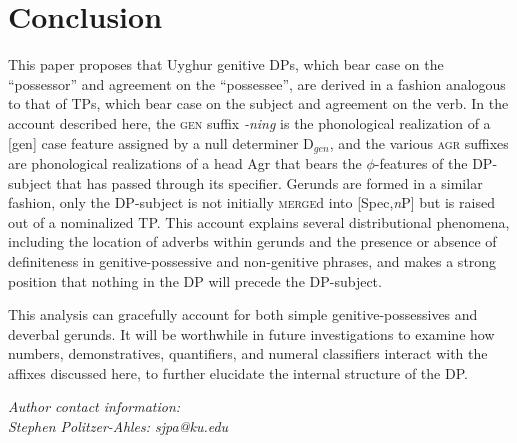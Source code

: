 \documentclass[letterpaper,12pt]{article}
\newcommand{\posst}{\textsc{agr}}
\newcommand{\gen}{\textsc{gen}}
\begin{document}
\section{Conclusion}
This paper proposes that Uyghur genitive DPs, which bear case on the ``possessor'' and agreement on the ``possessee'', are derived in a fashion analogous to that of
TPs, which bear case on the subject and agreement on the verb. In the account described here, the \gen{} suffix \textsl{-ning} is the phonological realization of
a [gen] case feature assigned by a null determiner D$_{gen}$, and the various \posst{} suffixes are phonological realizations of a head Agr that bears the $\phi$-features of the DP-subject that has passed through its specifier. Gerunds are formed in a similar fashion, only the
DP-subject is not initially \textsc{merge}d into [Spec,\textit{n}P] but is raised out of a nominalized TP. This account explains several distributional phenomena,
including the location of adverbs within gerunds and the presence or absence of definiteness in genitive-possessive and non-genitive phrases, and makes a strong
position that nothing in the DP will precede the DP-subject.

This analysis can gracefully account for both simple genitive-possessives and deverbal gerunds. It will be worthwhile in future investigations to examine how
numbers, demonstratives, quantifiers, and numeral classifiers interact with the affixes discussed here, to further elucidate the internal structure of the DP.




\vspace{.25in}
\noindent \textit{Author contact information:\\
Stephen Politzer-Ahles: \hspace{.05in} sjpa@ku.edu}
\end{document}

